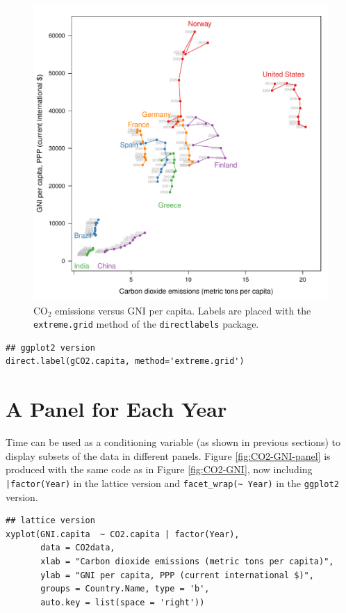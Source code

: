 \begin{figure}[htbp]
\centering
\includegraphics[width=.9\linewidth]{figs/CO2_capitaDL.pdf}
\caption{\(\mathrm{CO_2}\) emissions versus GNI per capita. Labels are placed with the \texttt{extreme.grid} method of the \texttt{directlabels} package. \label{fig:CO2-GNI-DL}}
\end{figure}

\lstset{language=r,label= ,caption= ,captionpos=b,numbers=none}
\begin{lstlisting}
## ggplot2 version
direct.label(gCO2.capita, method='extreme.grid')
\end{lstlisting}

\section{A Panel for Each Year}
\label{sec:org05cce9f}
Time can be used as a conditioning variable (as shown in previous
sections) to display subsets of the data in different panels. Figure
\ref{fig:CO2-GNI-panel} is produced with the same code as in Figure
\ref{fig:CO2-GNI}, now including \texttt{|factor(Year)} in the lattice
version and \texttt{facet\_wrap(\textasciitilde{} Year)} in the \texttt{ggplot2} version.

\lstset{language=r,label= ,caption= ,captionpos=b,numbers=none}
\begin{lstlisting}
## lattice version
xyplot(GNI.capita  ~ CO2.capita | factor(Year),
       data = CO2data,
       xlab = "Carbon dioxide emissions (metric tons per capita)",
       ylab = "GNI per capita, PPP (current international $)",
       groups = Country.Name, type = 'b',
       auto.key = list(space = 'right'))
\end{lstlisting}

